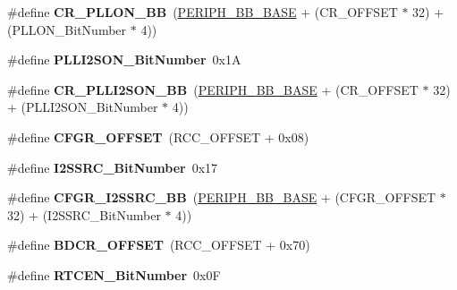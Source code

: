 \begin{DoxyCompactItemize}
\#define {\bfseries C\+R\+\_\+\+P\+L\+L\+O\+N\+\_\+\+BB}~(\hyperlink{group___peripheral__memory__map_gaed7efc100877000845c236ccdc9e144a}{P\+E\+R\+I\+P\+H\+\_\+\+B\+B\+\_\+\+B\+A\+SE} + (C\+R\+\_\+\+O\+F\+F\+S\+ET $\ast$ 32) + (P\+L\+L\+O\+N\+\_\+\+Bit\+Number $\ast$ 4))
\item 
\mbox{\label{group___r_c_c_gabae59c3e4200523e3aa5b6e10aee8c46}} 
\#define {\bfseries P\+L\+L\+I2\+S\+O\+N\+\_\+\+Bit\+Number}~0x1A
\item 
\mbox{\label{group___r_c_c_ga0c0fb27aba4eb660f7590252596bdfc5}} 
\#define {\bfseries C\+R\+\_\+\+P\+L\+L\+I2\+S\+O\+N\+\_\+\+BB}~(\hyperlink{group___peripheral__memory__map_gaed7efc100877000845c236ccdc9e144a}{P\+E\+R\+I\+P\+H\+\_\+\+B\+B\+\_\+\+B\+A\+SE} + (C\+R\+\_\+\+O\+F\+F\+S\+ET $\ast$ 32) + (P\+L\+L\+I2\+S\+O\+N\+\_\+\+Bit\+Number $\ast$ 4))
\item 
\mbox{\label{group___r_c_c_ga8682298330c3b9bae1992e4f1a0af985}} 
\#define {\bfseries C\+F\+G\+R\+\_\+\+O\+F\+F\+S\+ET}~(R\+C\+C\+\_\+\+O\+F\+F\+S\+ET + 0x08)
\item 
\mbox{\label{group___r_c_c_ga9561d436b438d8f513b754f1934c3e30}} 
\#define {\bfseries I2\+S\+S\+R\+C\+\_\+\+Bit\+Number}~0x17
\item 
\mbox{\label{group___r_c_c_ga9076f5ddbb262fd45584702f5d280c9e}} 
\#define {\bfseries C\+F\+G\+R\+\_\+\+I2\+S\+S\+R\+C\+\_\+\+BB}~(\hyperlink{group___peripheral__memory__map_gaed7efc100877000845c236ccdc9e144a}{P\+E\+R\+I\+P\+H\+\_\+\+B\+B\+\_\+\+B\+A\+SE} + (C\+F\+G\+R\+\_\+\+O\+F\+F\+S\+ET $\ast$ 32) + (I2\+S\+S\+R\+C\+\_\+\+Bit\+Number $\ast$ 4))
\item 
\mbox{\label{group___r_c_c_ga5f8a0c3cb5f5c835bf7eef09515138ad}} 
\#define {\bfseries B\+D\+C\+R\+\_\+\+O\+F\+F\+S\+ET}~(R\+C\+C\+\_\+\+O\+F\+F\+S\+ET + 0x70)
\item 
\mbox{\label{group___r_c_c_ga9302c551752124766afc4cee65436405}} 
\#define {\bfseries R\+T\+C\+E\+N\+\_\+\+Bit\+Number}~0x0F
\item 
\mbox{\label{group___r_c_c_gaf70aaf70b0752ccb3a60307b2fb46038}} 

\end{DoxyCompactItemize}
